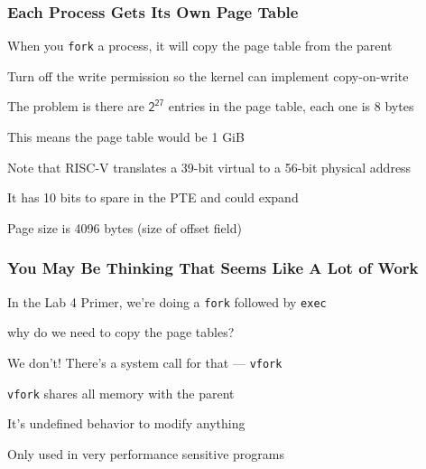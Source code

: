   \begin{frame}
    \frametitle{Each Process Gets Its Own Page Table}

    When you \texttt{fork} a process, it will copy the page table from the parent

    \hspace{2em} Turn off the write permission so the kernel can implement
    copy-on-write

    \vspace{2em}

    The problem is there are $\mathsf{2^{27}}$ entries in the page table, each
    one is 8 bytes

    \hspace{2em} This means the page table would be 1 GiB

    \vspace{2em}

    Note that RISC-V translates a 39-bit virtual to a 56-bit physical address

    \hspace{2em} It has 10 bits to spare in the PTE and could expand

    \hspace{2em} Page size is 4096 bytes (size of offset field)
  \end{frame}

  \begin{frame}
    \frametitle{You May Be Thinking That Seems Like A Lot of Work}

    In the Lab 4 Primer, we're doing a \texttt{fork} followed by \texttt{exec}
    
    \hspace{2em} why do we need to copy the page tables?

    \vspace{2em}

    We don't! There's a system call for that --- \texttt{vfork}

    \vspace{2em}

    \texttt{vfork} shares all memory with the parent

    \hspace{2em} It's undefined behavior to modify anything

    \vspace{2em}

    Only used in very performance sensitive programs
  \end{frame}

